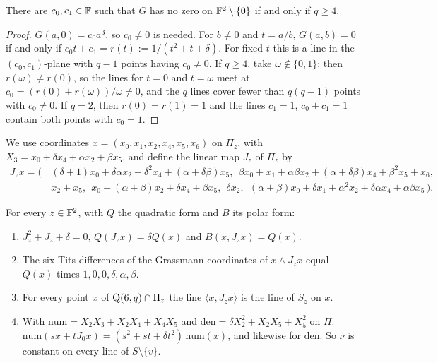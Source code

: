 \begin{lemma}\label{lem:G2}
There are $c_0,c_1\in\mathbb{F}$ such that $G$ has no zero on $\mathbb{F}^2\setminus\{0\}$ if and only if $q\ge4$.
\end{lemma}

\begin{proof}
$G(a,0)=c_0a^3$, so $c_0\ne0$ is needed. For $b\ne0$ and $t=a/b$, $G(a,b)=0$ if and only if $c_0t+c_1=r(t):=1/(t^2+t+\delta)$. For fixed $t$ this is a line in the $(c_0,c_1)$-plane with $q-1$ points having $c_0\ne0$. If $q\ge4$, take $\omega\notin\{0,1\}$; then $r(\omega)\ne r(0)$, so the lines for $t=0$ and $t=\omega$ meet at $c_0=(r(0)+r(\omega))/\omega\ne0$, and the $q$ lines cover fewer than $q(q-1)$ points with $c_0\ne0$. If $q=2$, then $r(0)=r(1)=1$ and the lines $c_1=1$, $c_0+c_1=1$ contain both points with $c_0=1$.
\end{proof}

We use coordinates $x=(x_0,x_1,x_2,x_4,x_5,x_6)$ on $\Pi_z$, with $X_3=x_0+\delta x_4+\alpha x_2+\beta x_5$, and define the linear map $J_z$ of $\Pi_z$ by
\[
\begin{aligned}
J_zx=\bigl(\,&(\delta+1)x_0+\delta\alpha x_2+\delta^2x_4+(\alpha+\delta\beta)x_5,\ \ \beta x_0+x_1+\alpha\beta x_2+(\alpha+\delta\beta)x_4+\beta^2x_5+x_6,\\
&x_2+x_5,\ \ x_0+(\alpha+\beta)x_2+\delta x_4+\beta x_5,\ \ \delta x_2,\ \ (\alpha+\beta)x_0+\delta x_1+\alpha^2x_2+\delta\alpha x_4+\alpha\beta x_5\,\bigr).
\end{aligned}
\]

\begin{lemma}\label{lem:J2}
For every $z\in\mathbb{F}^2$, with $Q$ the quadratic form and $B$ its polar form:
\begin{enumerate}[label=\textup{(\alph*)}]
\item $J_z^2+J_z+\delta=0$, $Q(J_zx)=\delta Q(x)$ and $B(x,J_zx)=Q(x)$.
\item The six Tits differences of the Grassmann coordinates of $x\wedge J_zx$ equal $Q(x)$ times $1,0,0,\delta,\alpha,\beta$.
\item For every point $x$ of $\mathrm{Q}(6,q)\cap\Pi_z$ the line $\langle x,J_zx\rangle$ is the line of $S_z$ on $x$.
\item With $\mathrm{num}=X_2X_3+X_2X_4+X_4X_5$ and $\mathrm{den}=\delta X_2^2+X_2X_5+X_5^2$ on $\Pi$: $\mathrm{num}(sx+tJ_0x)=(s^2+st+\delta t^2)\,\mathrm{num}(x)$, and likewise for $\mathrm{den}$. So $\nu$ is constant on every line of $S\setminus\{v\}$.
\end{enumerate}
\end{lemma}

